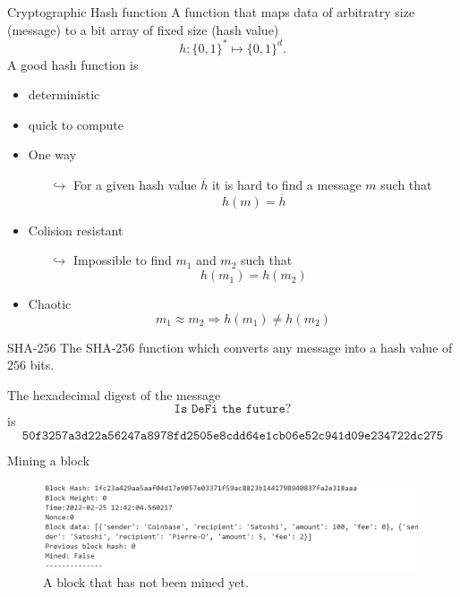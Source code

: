 \documentclass{beamer}
\begin{document}
\begin{frame}{Cryptographic Hash function}
\small
A function that maps data of arbitratry size (message) to a bit array of fixed size (hash value)
$$
h:\{0,1\}^\ast\mapsto \{0,1\}^d. 
$$
A good hash function is
\begin{itemize}
\item deterministic
\item quick to compute
\item One way
\begin{itemize}
  \scriptsize
\item[$\hookrightarrow$] For a given hash value $\overline{h}$ it is hard to find a message $m$ such that 
$$
h(m) = \overline{h}
$$
\end{itemize}
\item Colision resistant 
\begin{itemize}
\item[$\hookrightarrow$] Impossible to find $m_1$ and $m_2$ such that 
$$
h(m_1) = h(m_2)
$$
\end{itemize}
\item Chaotic
$$m_1\approx m_2\Rightarrow  h(m_1) \neq h(m_2)$$
\end{itemize}
\end{frame}
\begin{frame}{SHA-256}
The SHA-256 function which converts any message into a hash value of $256$ bits.
\begin{tcolorbox}[enhanced,drop shadow, title=Example]
The hexadecimal digest of the message
$$
\texttt{Is DeFi the future?}
$$
is 
\footnotesize
$$
\texttt{50f3257a3d22a56247a8978fd2505e8cdd64e1cb06e52c941d09e234722dc275}
$$
\end{tcolorbox}
\end{frame}
\begin{frame}{Mining a block}
\begin{figure}[!ht]
    \includegraphics[width = \textwidth]{../../Figures/block_not_mined.png}
    \captionsetup{width=0.8\textwidth}
    \centering
    \caption{A block that has not been mined yet.}
    \label{fig:block_not_mined}
\end{figure}
\end{frame}
\end{document}
